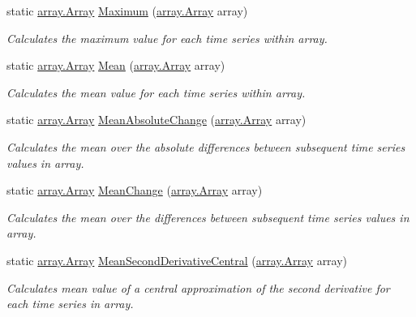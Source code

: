 \begin{DoxyCompactItemize}
static \mbox{\hyperlink{classkhiva_1_1array_1_1_array}{array.\+Array}} \mbox{\hyperlink{classkhiva_1_1features_1_1_features_acf9f8fa70526909d97eaafdfe3a2e446}{Maximum}} (\mbox{\hyperlink{classkhiva_1_1array_1_1_array}{array.\+Array}} array)
\begin{DoxyCompactList}\small\item\em Calculates the maximum value for each time series within array. \end{DoxyCompactList}\item 
static \mbox{\hyperlink{classkhiva_1_1array_1_1_array}{array.\+Array}} \mbox{\hyperlink{classkhiva_1_1features_1_1_features_a797758a91f71993552c3f6908d2bb85e}{Mean}} (\mbox{\hyperlink{classkhiva_1_1array_1_1_array}{array.\+Array}} array)
\begin{DoxyCompactList}\small\item\em Calculates the mean value for each time series within array. \end{DoxyCompactList}\item 
static \mbox{\hyperlink{classkhiva_1_1array_1_1_array}{array.\+Array}} \mbox{\hyperlink{classkhiva_1_1features_1_1_features_a04d4e4db46271eef51144eae76b00531}{Mean\+Absolute\+Change}} (\mbox{\hyperlink{classkhiva_1_1array_1_1_array}{array.\+Array}} array)
\begin{DoxyCompactList}\small\item\em Calculates the mean over the absolute differences between subsequent time series values in array. \end{DoxyCompactList}\item 
static \mbox{\hyperlink{classkhiva_1_1array_1_1_array}{array.\+Array}} \mbox{\hyperlink{classkhiva_1_1features_1_1_features_a50341ca54e63df0a57db6383be276920}{Mean\+Change}} (\mbox{\hyperlink{classkhiva_1_1array_1_1_array}{array.\+Array}} array)
\begin{DoxyCompactList}\small\item\em Calculates the mean over the differences between subsequent time series values in array. \end{DoxyCompactList}\item 
static \mbox{\hyperlink{classkhiva_1_1array_1_1_array}{array.\+Array}} \mbox{\hyperlink{classkhiva_1_1features_1_1_features_a9110d16052e9f3272eccc127cc0b9e36}{Mean\+Second\+Derivative\+Central}} (\mbox{\hyperlink{classkhiva_1_1array_1_1_array}{array.\+Array}} array)
\begin{DoxyCompactList}\small\item\em Calculates mean value of a central approximation of the second derivative for each time series in array. \end{DoxyCompactList}\item 

\end{DoxyCompactItemize}
